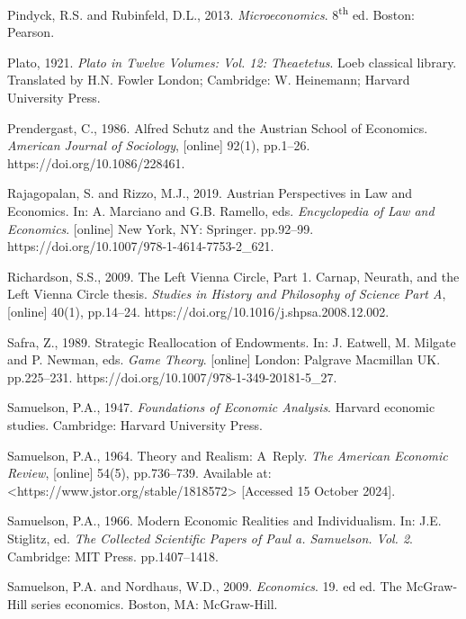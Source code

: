 Pindyck, R.S. and Rubinfeld, D.L., 2013. \textit{Microeconomics}. 8\textsuperscript{th} ed. Boston: Pearson.



Plato, 1921. \textit{Plato in Twelve Volumes: Vol. 12: Theaetetus}. Loeb classical library. Translated by H.N. Fowler London; Cambridge: W. Heinemann; Harvard University Press.



Prendergast, C., 1986. Alfred Schutz and the Austrian School of Economics. \textit{American Journal of Sociology}, [online] 92(1), pp.1–26. https://doi.org/10.1086/228461.



Rajagopalan, S. and Rizzo, M.J., 2019. Austrian Perspectives in Law and Economics. In: A. Marciano and G.B. Ramello, eds. \textit{Encyclopedia of Law and Economics}. [online] New York, NY: Springer. pp.92–99. https://doi.org/10.1007/978-1-4614-7753-2\_621.



Richardson, S.S., 2009. The Left Vienna Circle, Part 1. Carnap, Neurath, and the Left Vienna Circle thesis. \textit{Studies in History and Philosophy of Science Part A}, [online] 40(1), pp.14–24. https://doi.org/10.1016/j.shpsa.2008.12.002.



Safra, Z., 1989. Strategic Reallocation of Endowments. In: J. Eatwell, M. Milgate and P. Newman, eds. \textit{Game Theory}. [online] London: Palgrave Macmillan UK. pp.225–231. https://doi.org/10.1007/978-1-349-20181-5\_27.



Samuelson, P.A., 1947. \textit{Foundations of Economic Analysis}. Harvard economic studies. Cambridge: Harvard University Press.



Samuelson, P.A., 1964. Theory and Realism: A~Reply. \textit{The American Economic Review}, [online] 54(5), pp.736–739. Available at: {\textless}https://www.jstor.org/stable/1818572{\textgreater} [Accessed 15 October 2024].



Samuelson, P.A., 1966. Modern Economic Realities and Individualism. In: J.E. Stiglitz, ed. \textit{The Collected Scientific Papers of Paul a. Samuelson. Vol. 2}. Cambridge: MIT Press. pp.1407–1418.



Samuelson, P.A. and Nordhaus, W.D., 2009. \textit{Economics}. 19. ed ed. The McGraw-Hill series economics. Boston, MA: McGraw-Hill.



